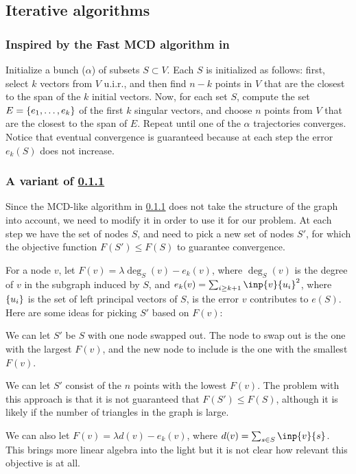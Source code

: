 \documentclass{article}
\begin{document}
\subsection{Iterative algorithms}
\subsubsection{Inspired by the Fast MCD algorithm in \cite{rousseeuw1999fast}}\label{alg: fast MCD-like}
Initialize a bunch ($\alpha$) of subsets $S\subset V$. Each $S$ is initialized as follows: first, select $k$ vectors from $V$ u.i.r., and then find $n-k$ points in $V$ that are the closest to the span of the $k$ initial vectors. Now, for each set $S$, compute the set $E = \left\{e_1,\dots, e_k\right\}$ of the first $k$ singular vectors, and choose $n$ points from $V$ that are the closest to the span of $E$. Repeat until one of the $\alpha$ trajectories converges. Notice that eventual convergence is guaranteed because at each step the error $e_k(S)$ does not increase.

\subsubsection{A variant of \ref{alg: fast MCD-like}}
Since the MCD-like algorithm in \ref{alg: fast MCD-like} does not take the structure of the graph into account, we need to modify it in order to use it for our problem. At each step we have the set of nodes $S$, and need to pick a new set of nodes $S'$, for which the objective function $F(S') \leq F(S)$ to guarantee convergence.

For a node $v$, let $F(v) = \lambda \deg_S(v) - e_k(v)$, where $\deg_S(v)$ is the degree of $v$ in the subgraph induced by $S$, and $e_k(v) = \sum_{i\geq k+1}\inp{v}{u_i}^2$, where $\left\{u_i\right\}$ is the set of left principal vectors of $S$, is the error $v$ contributes to $e(S)$. Here are some ideas for picking $S'$ based on $F(v)$:

We can let $S'$ be $S$ with one node swapped out. The node to swap out is the one with the largest $F(v)$, and the new node to include is the one with the smallest $F(v)$.

We can let $S'$ consist of the $n$ points with the lowest $F(v)$. The problem with this approach is that it is not guaranteed that $F(S') \leq F(S)$, although it is likely if the number of triangles in the graph is large.

We can also let $F(v) = \lambda d(v) - e_k(v)$, where $d(v) = \sum_{s\in S}\inp{v}{s}$. This brings more linear algebra into the light but it is not clear how relevant this objective is at all.
\end{document}
